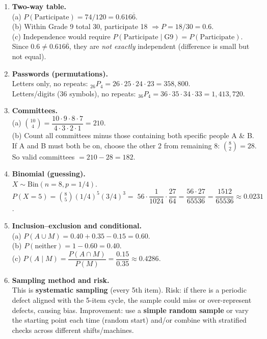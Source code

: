 \documentclass[11pt]{article}
\begin{document}
\begin{enumerate}
\item \textbf{Two-way table.}\\
(a) $P(\text{Participate})=74/120=0.616\overline{6}$.\\
(b) Within Grade 9 total 30, participate 18 $\Rightarrow P=18/30=0.6$.\\
(c) Independence would require $P(\text{Participate}\mid \text{G9})=P(\text{Participate})$. Since $0.6\neq 0.616\overline{6}$, they are \emph{not exactly} independent (difference is small but not equal).

\item \textbf{Passwords (permutations).}\\
Letters only, no repeats: $_{26}P_4=26\cdot25\cdot24\cdot23=358{,}800$.\\
Letters/digits (36 symbols), no repeats: $_{36}P_4=36\cdot35\cdot34\cdot33=1{,}413{,}720$.

\item \textbf{Committees.}\\
(a) $\binom{10}{4}=\dfrac{10\cdot9\cdot8\cdot7}{4\cdot3\cdot2\cdot1}=210$.\\
(b) Count all committees minus those containing both specific people A \& B. If A and B must both be on, choose the other 2 from remaining 8: $\binom{8}{2}=28$. So valid committees $=210-28=182$.

\item \textbf{Binomial (guessing).}\\
$X\sim \text{Bin}(n=8,p=1/4)$. $P(X=5)=\binom{8}{5}(1/4)^5(3/4)^3=\;56\cdot \dfrac{1}{1024}\cdot \dfrac{27}{64}=\dfrac{56\cdot27}{65536}=\dfrac{1512}{65536}\approx0.0231$.

\item \textbf{Inclusion--exclusion and conditional.}\\
(a) $P(A\cup M)=0.40+0.35-0.15=0.60$.\\
(b) $P(\text{neither})=1-0.60=0.40$.\\
(c) $P(A\mid M)=\dfrac{P(A\cap M)}{P(M)}=\dfrac{0.15}{0.35}\approx0.4286$.

\item \textbf{Sampling method and risk.}\\
This is \textbf{systematic sampling} (every 5th item). Risk: if there is a periodic defect aligned with the 5-item cycle, the sample could miss or over-represent defects, causing bias. Improvement: use a \textbf{simple random sample} or vary the starting point each time (random start) and/or combine with stratified checks across different shifts/machines.

\end{enumerate}
\end{document}
